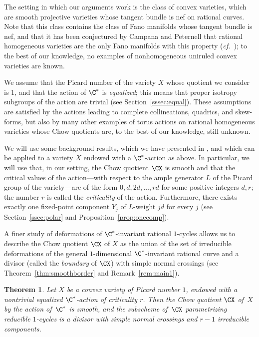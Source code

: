 \documentclass[11pt]{amsart}
\numberwithin{equation}{section}
\newtheorem{theorem}{Theorem}[section]
\theoremstyle{definition}
\theoremstyle{remark}
\begin{document}
The setting in which our arguments work is the class of convex varieties, which are smooth projective varieties whose tangent bundle is nef on rational curves. Note that this class contains the class of Fano manifolds whose tangent bundle is nef, and that it has been conjectured by Campana and Peternell that rational homogeneous varieties are the only Fano manifolds with this property (\textit{cf.}~\cite{CP,MOSWW}); to the best of our knowledge, no examples of nonhomogeneous uniruled convex varieties are known.

We assume that the Picard number of the variety $X$ whose quotient we consider is $1$, and that the action of $\C^*$ is {\em equalized}; this means that proper isotropy subgroups of the action are trivial (see Section~\ref{sssec:equal}). These assumptions are satisfied by the actions leading to complete collineations, quadrics, and skew-forms, but also by many other examples of torus actions on rational homogeneous varieties whose Chow quotients are, to the best of our knowledge, still unknown.

We will use some background results, which we have presented in \cite{WORS6,OS2}, and which can be applied to a variety $X$ endowed with a $\C^*$-action as above. In particular, we will use that, in our setting, the Chow quotient $\CX$ is smooth and that the critical values of the action---with respect to the ample generator $L$ of the Picard group of  the variety---are of the form $0,d,2d,\dots,rd$ for some positive integers $d,r$; the number $r$ is called the {\em criticality} of the action.
Furthermore, there exists  exactly one fixed-point component $Y_j$ of $L$-weight $jd$ for every $j$ (see Section~\ref{ssec:polar} and Proposition~\ref{prop:onecomp}).

A finer study of deformations of $\C^*$-invariant rational $1$-cycles allows us to describe the Chow quotient $\CX$ of $X$ as the union of the set of irreducible deformations of the general $1$-dimensional $\C^*$-invariant rational curve and a divisor (called the {\em boundary} of $\CX$) with simple normal crossings (see Theorem~\ref{thm:smoothborder} and Remark~\ref{rem:main1}). 

\begin{theorem}\label{thm:main1}
  Let $X$ be a convex variety of Picard number $1$,   endowed with a nontrivial equalized $\C^*$-action of criticality $r$. Then the Chow quotient $\CX$ of\, $X$ by the action of\, $\C^*$ is smooth, and the subscheme of\, $\CX$ parametrizing reducible $1$-cycles is a divisor with simple normal crossings and $r-1$ irreducible components.
\end{theorem}
\end{document}
